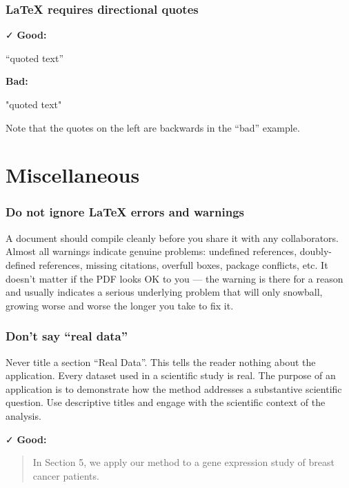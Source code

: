 \documentclass{article}
\newcommand{\xmark}{\textcolor{red}{\faXmark}}
\newcommand{\cmark}{\textcolor{goodcolor}{\faCheck}}
\newcommand{\bad}{\xmark\; \textbf{Bad:}}
\newcommand{\good}{\cmark\; \textbf{Good:}}
\begin{document}
\subsubsection*{LaTeX requires directional quotes}

\good

\begin{LTXexample}
``quoted text''
\end{LTXexample}

\bad

\begin{LTXexample}
"quoted text"
\end{LTXexample}

Note that the quotes on the left are backwards in the ``bad'' example.

\section{Miscellaneous}

\subsubsection*{Do not ignore LaTeX errors and warnings}

A document should compile cleanly before you share it with any collaborators. Almost all warnings indicate genuine problems: undefined references, doubly-defined references, missing citations, overfull boxes, package conflicts, etc. It doesn't matter if the PDF looks OK to you --- the warning is there for a reason and usually indicates a serious underlying problem that will only snowball, growing worse and worse the longer you take to fix it.

\subsubsection*{Don't say ``real data''}

Never title a section ``Real Data''. This tells the reader nothing about the application. Every dataset used in a scientific study is real. The purpose of an application is to demonstrate how the method addresses a substantive scientific question. Use descriptive titles and engage with the scientific context of the analysis.

\good

\begin{quote}
In Section 5, we apply our method to a gene expression study of breast cancer patients.
\end{quote}
\end{document}

